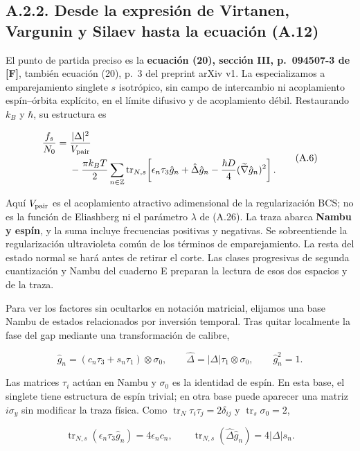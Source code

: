 \documentclass[
  spanish,
  10pt,
  a4paper,
]{article}
\begin{document}
\subsection{A.2.2. Desde la expresión de Virtanen, Vargunin y Silaev
hasta la ecuación
(A.12)}\label{a.2.2.-desde-la-expresiuxf3n-de-virtanen-vargunin-y-silaev-hasta-la-ecuaciuxf3n-a.12}

El punto de partida preciso es la \textbf{ecuación (20), sección III,
p.~094507-3 de {[}F{]}}, también ecuación (20), p.~3 del preprint arXiv
v1. La especializamos a emparejamiento singlete \(s\) isotrópico, sin
campo de intercambio ni acoplamiento espín--órbita explícito, en el
límite difusivo y de acoplamiento débil. Restaurando \(k_B\) y
\(\hbar\), su estructura es

\[
\begin{aligned}
\frac{f_s}{N_0}
={}&\frac{|\Delta|^2}{V_{\rm pair}}\\
&-\frac{\pi k_BT}{2}\sum_{n\in\mathbb Z}
\operatorname{tr}_{N,s}\!\left[
\epsilon_n\tau_3\hat g_n+\hat\Delta\hat g_n
-\frac{\hbar D}{4}(\widetilde\nabla\hat g_n)^2
\right].
\end{aligned}
\tag{A.6}
\]

Aquí \(V_{\rm pair}\) es el acoplamiento atractivo adimensional de la
regularización BCS; no es la función de Eliashberg ni el parámetro
\(\lambda\) de (A.26). La traza abarca \textbf{Nambu y espín}, y la suma
incluye frecuencias positivas y negativas. Se sobreentiende la
regularización ultravioleta común de los términos de emparejamiento. La
resta del estado normal se hará antes de retirar el corte. Las clases
progresivas de segunda cuantización y Nambu del cuaderno E preparan la
lectura de esos dos espacios y de la traza.

Para ver los factores sin ocultarlos en notación matricial, elijamos una
base Nambu de estados relacionados por inversión temporal. Tras quitar
localmente la fase del gap mediante una transformación de calibre,

\[
\hat g_n=(c_n\tau_3+s_n\tau_1)\otimes\sigma_0,
\qquad \hat\Delta=|\Delta|\tau_1\otimes\sigma_0,
\qquad \hat g_n^2=1.
\tag{A.7}
\]

Las matrices \(\tau_i\) actúan en Nambu y \(\sigma_0\) es la identidad
de espín. En esta base, el singlete tiene estructura de espín trivial;
en otra base puede aparecer una matriz \(i\sigma_y\) sin modificar la
traza física. Como \(\operatorname{tr}_N\tau_i\tau_j=2\delta_{ij}\) y
\(\operatorname{tr}_s\sigma_0=2\),

\[
\operatorname{tr}_{N,s}(\epsilon_n\tau_3\hat g_n)=4\epsilon_nc_n,
\qquad
\operatorname{tr}_{N,s}(\hat\Delta\hat g_n)=4|\Delta|s_n.
\tag{A.8}
\]
\end{document}
